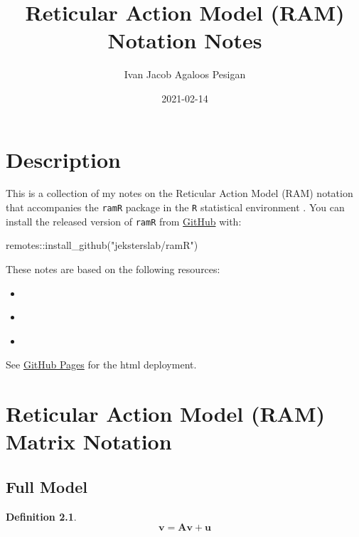 \documentclass[
]{book}
\title{Reticular Action Model (RAM) Notation Notes}
\author{Ivan Jacob Agaloos Pesigan}
\date{2021-02-14}
\newenvironment{Shaded}{\begin{snugshade}}{\end{snugshade}}
\newcommand{\FunctionTok}[1]{\textcolor[rgb]{0.00,0.00,0.00}{#1}}
\newcommand{\NormalTok}[1]{#1}
\newcommand{\SpecialCharTok}[1]{\textcolor[rgb]{0.00,0.00,0.00}{#1}}
\newcommand{\StringTok}[1]{\textcolor[rgb]{0.31,0.60,0.02}{#1}}
\providecommand{\tightlist}{%
  \setlength{\itemsep}{0pt}\setlength{\parskip}{0pt}}
\theoremstyle{definition}
\newtheorem{definition}{Definition}[chapter]
\theoremstyle{definition}
\theoremstyle{definition}
\theoremstyle{remark}
\begin{document}
\maketitle

{
\setcounter{tocdepth}{1}
\tableofcontents
}
\hypertarget{description}{%
\chapter{Description}\label{description}}

This is a collection of my notes
on the Reticular Action Model (RAM) notation
that accompanies the \texttt{ramR} package \citep{R-ramR}
in the \texttt{R} statistical environment \citep{R-base}.
You can install the released version of \texttt{ramR}
from \href{https://github.com/jeksterslab/ramR}{GitHub} with:

\begin{Shaded}
\begin{Highlighting}[]
\NormalTok{remotes}\SpecialCharTok{::}\FunctionTok{install\_github}\NormalTok{(}\StringTok{"jeksterslab/ramR"}\NormalTok{)}
\end{Highlighting}
\end{Shaded}

These notes are based on the following resources:

\begin{itemize}
\tightlist
\item
  \citet{Boker-2005}
\item
  \citet{McArdle-1984}
\item
  \citet{McArdle-2005}
\end{itemize}

See \href{https://jeksterslab.github.io/ramR_notes/index.html}{GitHub Pages}
for the html deployment.

\hypertarget{ram-matrix-notation}{%
\chapter{Reticular Action Model (RAM) Matrix Notation}\label{ram-matrix-notation}}

\hypertarget{full-model}{%
\section{Full Model}\label{full-model}}

\begin{definition}
\protect\hypertarget{def:unnamed-chunk-2}{}{\label{def:unnamed-chunk-2} }\begin{equation}
  \mathbf{v}
  =
  \mathbf{A} \mathbf{v} + \mathbf{u}
\end{equation}
\end{definition}
\end{document}
